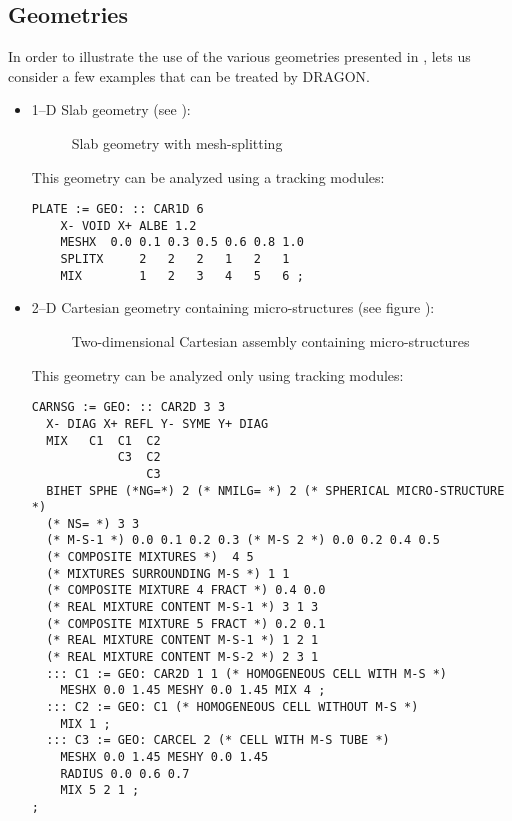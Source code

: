 \subsection{Geometries}\label{sect:ExGEOData}

In order to illustrate the use of the various geometries presented in
, lets us consider a few examples that can be treated
by DRAGON.

\begin{itemize}

\item 1--D Slab geometry (see ):

\begin{figure}[h!] 
\begin{center} 
\epsfxsize=11cm \centerline{ }
\parbox{14cm}{\caption{Slab geometry with mesh-splitting}
\label{fig:plaque}}    
\end{center}  
\end{figure}

This geometry can be analyzed using a  tracking
modules:

\begin{verbatim}
PLATE := GEO: :: CAR1D 6
    X- VOID X+ ALBE 1.2
    MESHX  0.0 0.1 0.3 0.5 0.6 0.8 1.0
    SPLITX     2   2   2   1   2   1
    MIX        1   2   3   4   5   6 ;
\end{verbatim}
                                                                
\item 2--D Cartesian geometry containing micro-structures (see
figure ):

\begin{figure}[h!] 
\begin{center} 
\epsfxsize=10cm \centerline{ }
\parbox{14cm}{\caption{Two-dimensional Cartesian assembly containing
micro-structures} \label{fig:grains}}    
\end{center}  
\end{figure}

This geometry can be analyzed only using 
tracking modules:

\begin{verbatim}
CARNSG := GEO: :: CAR2D 3 3 
  X- DIAG X+ REFL Y- SYME Y+ DIAG
  MIX   C1  C1  C2
            C3  C2
                C3 
  BIHET SPHE (*NG=*) 2 (* NMILG= *) 2 (* SPHERICAL MICRO-STRUCTURE *)
  (* NS= *) 3 3
  (* M-S-1 *) 0.0 0.1 0.2 0.3 (* M-S 2 *) 0.0 0.2 0.4 0.5
  (* COMPOSITE MIXTURES *)  4 5
  (* MIXTURES SURROUNDING M-S *) 1 1
  (* COMPOSITE MIXTURE 4 FRACT *) 0.4 0.0
  (* REAL MIXTURE CONTENT M-S-1 *) 3 1 3
  (* COMPOSITE MIXTURE 5 FRACT *) 0.2 0.1
  (* REAL MIXTURE CONTENT M-S-1 *) 1 2 1
  (* REAL MIXTURE CONTENT M-S-2 *) 2 3 1
  ::: C1 := GEO: CAR2D 1 1 (* HOMOGENEOUS CELL WITH M-S *)
    MESHX 0.0 1.45 MESHY 0.0 1.45 MIX 4 ;
  ::: C2 := GEO: C1 (* HOMOGENEOUS CELL WITHOUT M-S *)
    MIX 1 ;
  ::: C3 := GEO: CARCEL 2 (* CELL WITH M-S TUBE *)
    MESHX 0.0 1.45 MESHY 0.0 1.45
    RADIUS 0.0 0.6 0.7
    MIX 5 2 1 ;
;
\end{verbatim}



\end{itemize}
